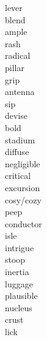 \documentclass[a4paper, 11pt]{ctexart}
\begin{document}
\begin{multicols*}{3}
\begin{description}
\item[lever]

\item[blend]

\item[ample]

\item[rash]

\item[radical]

\item[pillar]

\item[grip]

\item[antenna]

\item[sip]

\item[devise]

\item[bold]

\item[stadium]

\item[diffuse]

\item[negligible]

\item[critical]

\item[excursion]

\item[cosy/cozy]

\item[peep]

\item[conductor]

\item[isle]

\item[intrigue]

\item[stoop]

\item[inertia]

\item[luggage]

\item[plausible]

\item[nucleus]

\item[crust]

\item[lick]


\end{description}
\end{multicols*}
\end{document}
